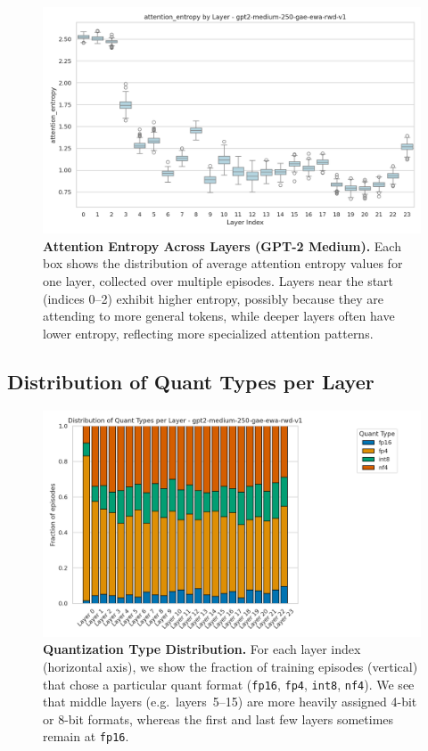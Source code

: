 \documentclass{article}
\begin{document}
	\begin{figure}[ht]
		\centering
		\includegraphics[width=1.0\linewidth]{gpt2-medium-250-gae-ewa-rwd-v1_layerstats_attention_entropy.png}
		\caption{\small
			\textbf{Attention Entropy Across Layers (GPT-2 Medium).}
			Each box shows the distribution of average attention entropy values for one layer, collected over multiple episodes. 
			Layers near the start (indices 0--2) exhibit higher entropy, possibly because they are attending to more general tokens, while deeper layers often have lower entropy, reflecting more specialized attention patterns.
		}
		\label{fig:gpt2medium-attn-entropy}
	\end{figure}
	
	\subsection{Distribution of Quant Types per Layer}
	\label{sec:medium-quant-dist}
	
	\begin{figure}[ht]
		\centering
		\includegraphics[width=0.85\linewidth]{gpt2-medium-250-gae-ewa-rwd-v1_quant_dist_bar.png}
		\caption{\small
			\textbf{Quantization Type Distribution.}
			For each layer index (horizontal axis), we show the fraction of training episodes (vertical) that chose a particular quant format (\texttt{fp16}, \texttt{fp4}, \texttt{int8}, \texttt{nf4}). 
			We see that middle layers (e.g.\ layers~5--15) are more heavily assigned 4-bit or 8-bit formats, whereas the first and last few layers sometimes remain at \texttt{fp16}.
		}
		\label{fig:gpt2medium-quant-dist}
	\end{figure}
	
\end{document}
